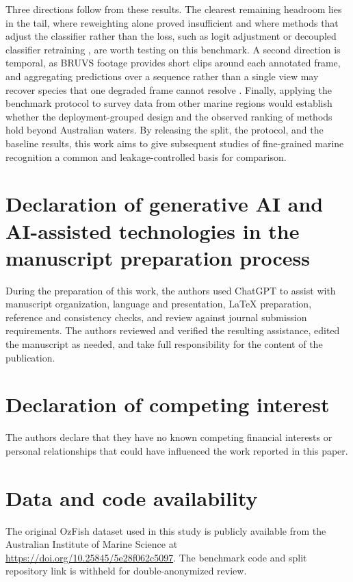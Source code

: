 \documentclass[preprint,12pt]{elsarticle}
\begin{document}
Three directions follow from these results. The clearest remaining
headroom lies in the tail, where reweighting alone proved insufficient
and where methods that adjust the classifier rather than the loss, such
as logit adjustment or decoupled classifier retraining
\citep{ref65}, are worth testing on this
benchmark. A second direction is temporal, as BRUVS footage provides
short clips around each annotated frame, and aggregating predictions
over a sequence rather than a single view may recover species that one
degraded frame cannot resolve \citep{ref50}.
Finally, applying the benchmark protocol to survey data from other
marine regions \citep{ref13} would establish
whether the deployment-grouped design and the observed ranking of
methods hold beyond Australian waters. By releasing the split, the
protocol, and the baseline results, this work aims to give subsequent
studies of fine-grained marine recognition a common and
leakage-controlled basis for comparison.

\section*{Declaration of generative AI and AI-assisted technologies in the manuscript preparation process}

During the preparation of this work, the authors used ChatGPT to assist
with manuscript organization, language and presentation, LaTeX
preparation, reference and consistency checks, and review against
journal submission requirements. The authors reviewed and verified the
resulting assistance, edited the manuscript as needed, and take full
responsibility for the content of the publication.

\section*{Declaration of competing interest}

The authors declare that they have no known competing financial
interests or personal relationships that could have influenced the work
reported in this paper.

\section*{Data and code availability}

The original OzFish dataset used in this study is publicly available
from the Australian Institute of Marine Science at
\url{https://doi.org/10.25845/5e28f062c5097}. The benchmark code and split repository link is withheld for double-anonymized review.



\end{document}
